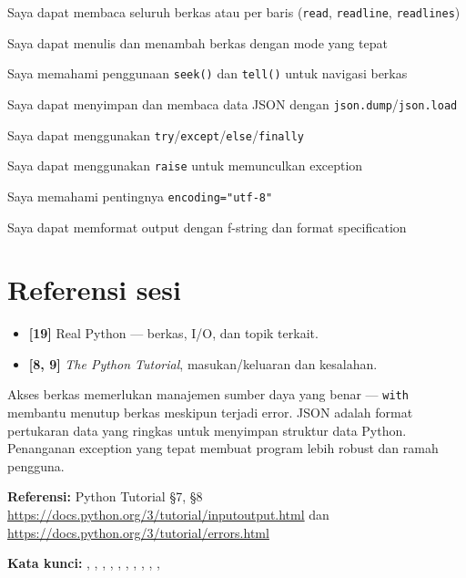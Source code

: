 \documentclass[../main.tex]{subfiles}
\begin{document}
\begin{checklist}
  \item Saya dapat membaca seluruh berkas atau per baris (\texttt{read}, \texttt{readline}, \texttt{readlines})
  \item Saya dapat menulis dan menambah berkas dengan mode yang tepat
  \item Saya memahami penggunaan \texttt{seek()} dan \texttt{tell()} untuk navigasi berkas
  \item Saya dapat menyimpan dan membaca data JSON dengan \texttt{json.dump}/\texttt{json.load}
  \item Saya dapat menggunakan \texttt{try}/\texttt{except}/\texttt{else}/\texttt{finally}
  \item Saya dapat menggunakan \texttt{raise} untuk memunculkan exception
  \item Saya memahami pentingnya \texttt{encoding="utf-8"}
  \item Saya dapat memformat output dengan f-string dan format specification
\end{checklist}

\section{Referensi sesi}

\begin{itemize}[leftmargin=*]
  \item \textbf{[19]} Real Python --- berkas, I/O, dan topik terkait.
  \item \textbf{[8, 9]} \textit{The Python Tutorial}, masukan/keluaran dan kesalahan.
\end{itemize}

\begin{rangkuman}
Akses berkas memerlukan manajemen sumber daya yang benar --- \texttt{with} membantu menutup berkas meskipun terjadi error. JSON adalah format pertukaran data yang ringkas untuk menyimpan struktur data Python. Penanganan exception yang tepat membuat program lebih robust dan ramah pengguna.

\textbf{Referensi:} {\small Python Tutorial §7, §8 \url{https://docs.python.org/3/tutorial/inputoutput.html} dan \url{https://docs.python.org/3/tutorial/errors.html}}

\textbf{Kata kunci:} , , , , , , , , , , 
\end{rangkuman}
\end{document}
